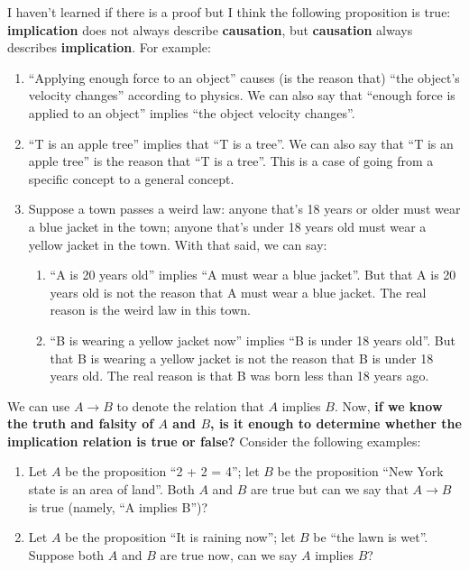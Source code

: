 \documentclass[12pt, letterpaper]{article}
\begin{document}
I haven't learned if there is a proof but I think the following proposition is
true: \textbf{implication} does not always describe \textbf{causation}, but
\textbf{causation} always describes \textbf{implication}. For example:
\begin{enumerate}
  \item ``Applying enough force to an object'' causes (is the reason that)
    ``the object's velocity changes'' according to physics. We can also say
    that ``enough force is applied to an object'' implies ``the object velocity
    changes''.
  \item ``T is an apple tree'' implies that ``T is a tree''. We can also say
    that ``T is an apple tree'' is the reason that ``T is a tree''. This is a
    case of going from a specific concept to a general concept.
  \item Suppose a town passes a weird law: anyone that's 18 years or older must
    wear a blue jacket in the town; anyone that's under 18 years old must wear
    a yellow jacket in the town. With that said, we can say:
    \begin{enumerate}
      \item ``A is 20 years old'' implies ``A must wear a blue jacket''. But
        that A is 20 years old is not the reason that A must wear a blue jacket.
        The real reason is the weird law in this town.
      \item ``B is wearing a yellow jacket now'' implies ``B is under 18 years
        old''. But that B is wearing a yellow jacket is not the reason that B
        is under 18 years old. The real reason is that B was born less than 18
        years ago.
    \end{enumerate}
\end{enumerate}

We can use $A \rightarrow B$ to denote the relation that $A$ implies $B$. Now,
\textbf{if we know the truth and falsity of $A$ and $B$, is it enough to
determine whether the implication relation is true or false?} Consider the
following examples:
\begin{enumerate}
  \item Let $A$ be the proposition ``2 + 2 = 4''; let $B$ be the proposition
    ``New York state is an area of land''. Both $A$ and $B$ are true but can we
    say that $A \rightarrow B$ is true (namely, ``A implies B'')?
  \item Let $A$ be the proposition ``It is raining now''; let $B$ be ``the lawn
    is wet''. Suppose both $A$ and $B$ are true now, can we say $A$ implies $B$?
\end{enumerate}
\end{document}
